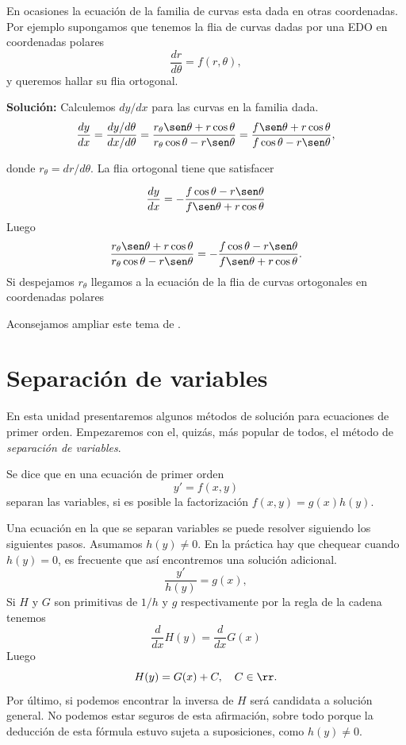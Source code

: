 \begin{problema}
En ocasiones la ecuación de la familia de curvas esta dada en otras coordenadas. Por ejemplo supongamos que tenemos la flia de curvas dadas por una EDO en coordenadas polares
\[\frac{dr}{d\theta}=f(r,\theta)\label{eq:flia_curvas_polar},\]
y queremos hallar su flia ortogonal.
\end{problema}

\noindent\textbf{Solución:} Calculemos $dy/dx$ para las curvas en la familia dada.
\[\frac{dy}{dx}=\frac{dy/d\theta}{dx/d\theta}=\frac{r_{\theta}\sen\theta+r\cos\theta}{r_{\theta}\cos\theta-r\sen\theta}=\frac{f\sen\theta+r\cos\theta}{f\cos\theta-r\sen\theta},\]

donde $r_{\theta}=dr/d\theta$. La flia ortogonal tiene que satisfacer

\[\frac{dy}{dx}=-\frac{f\cos\theta-r\sen\theta}{f\sen\theta+r\cos\theta}\]
Luego
\[\frac{r_{\theta}\sen\theta+r\cos\theta}{r_{\theta}\cos\theta-r\sen\theta}=-\frac{f\cos\theta-r\sen\theta}{f\sen\theta+r\cos\theta}.\]
Si despejamos $r_{\theta}$ llegamos a la ecuación de la flia de curvas ortogonales en coordenadas polares


Aconsejamos ampliar este tema de \cite{simmons_esp}. \lectura



\section{Separación de variables}
En esta unidad presentaremos algunos métodos de solución para ecuaciones de primer orden. Empezaremos con el, quizás, más popular de todos, el método de \emph{separación de variables}.

\begin{definicion} Se dice que en una ecuación de primer orden
 \[y'=f(x,y)\]
 separan las variables, si es posible la factorización $f(x,y)=g(x)h(y)$.
\end{definicion}



Una ecuación  en la que se separan variables se puede resolver siguiendo los siguientes pasos. Asumamos $h(y)\neq 0$. En la práctica hay que chequear cuando $h(y)=0$, es frecuente que así encontremos una solución adicional.
\[\frac{y'}{h(y)}=g(x),\]
Si $H$ y $G$ son primitivas de $1/h$ y $g$ respectivamente por la regla de la cadena tenemos
\[\frac{d}{dx}H(y)=\frac{d}{dx}G(x)\]
Luego 
\[H(y)=G(x)+C,\quad C\in\rr.\]
Por último, si podemos encontrar la inversa de $H$
será candidata a solución general. No podemos estar seguros de esta afirmación, sobre todo porque la deducción de esta fórmula estuvo sujeta a suposiciones, como $h(y)\neq 0$.



